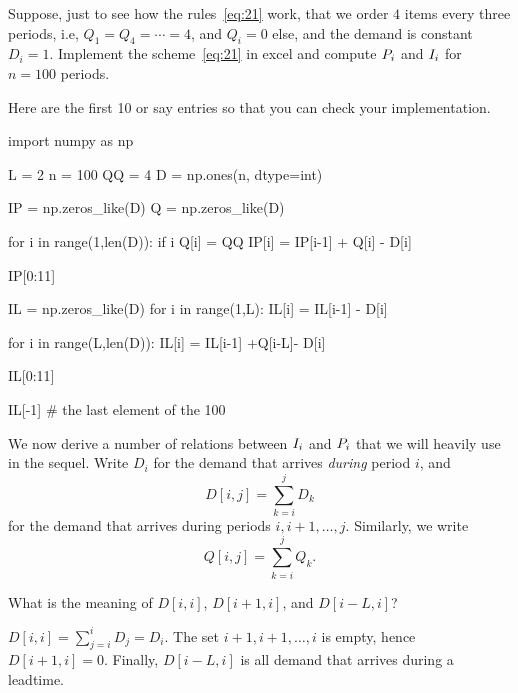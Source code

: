 \begin{exercise}\label{ex:8}
  Suppose, just to see how the rules~\eqref{eq:21} work, that we order $4$ items every three periods, i.e, $Q_1=Q_4=\cdots = 4$, and $Q_i=0$ else, and the demand is constant $D_i=1$. Implement the scheme~\eqref{eq:21} in excel and compute $P_i$ and $I_i$ for $n=100$ periods.
  \begin{solution}
Here are the first 10 or say entries so that you can check your implementation.
\begin{pyconsole}[dynamics]
import numpy as np

L = 2
n = 100
QQ = 4
D = np.ones(n, dtype=int)

IP = np.zeros_like(D)
Q = np.zeros_like(D)

for i in range(1,len(D)):
    if i %
        Q[i] = QQ
    IP[i] = IP[i-1] + Q[i] - D[i]

IP[0:11]

IL = np.zeros_like(D)
for i in range(1,L):
    IL[i] = IL[i-1] - D[i]

for i in range(L,len(D)):
    IL[i] = IL[i-1] +Q[i-L]- D[i]


IL[0:11]

IL[-1] # the last element of the 100
\end{pyconsole}
  \end{solution}
\end{exercise}

We now derive a number of relations between $I_i$ and $P_i$ that we will heavily use in the sequel. Write $D_i$ for the demand that arrives \emph{during} period $i$, and 
\begin{equation*}
  D[i, j] = \sum_{k=i}^j D_k 
\end{equation*}
for the demand that arrives during periods $i, i+1, \ldots, j$.    Similarly, we write
\begin{equation*}
  Q[i, j] = \sum_{k=i}^j Q_k.
\end{equation*}


\begin{exercise}
What is the meaning of $D[i,i]$, $D[i+1, i]$, and $D[i-L, i]$? 
  \begin{solution}
    $D[i,i] = \sum_{j=i}^i D_j = D_i$. The set $i+1, i+1, \ldots, i$ is empty, hence $D[i+1, i]=0$. Finally, $D[i-L, i]$ is all demand that arrives during a leadtime. 
  \end{solution}
\end{exercise}


